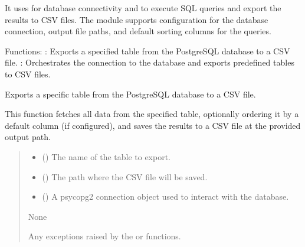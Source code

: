 \documentclass[letterpaper,10pt,english]{sphinxmanual}
\begin{document}
\sphinxAtStartPar
It uses  for database connectivity and  to execute SQL queries and export the results
to CSV files. The module supports configuration for the database connection, output file paths,
and default sorting columns for the queries.

\sphinxAtStartPar
Functions:
\sphinxhyphen{} : Exports a specified table from the PostgreSQL database to a CSV file.
\sphinxhyphen{} : Orchestrates the connection to the database and exports predefined tables to CSV files.

\begin{fulllineitems}
\label{\detokenize{modules.data_storage:modules.data_storage.data_export.export_table_to_csv}}
\pysigstartsignatures
\pysiglinewithargsret
{}
{\sphinxparamcomma {}\sphinxparamcomma {}}
{}
\pysigstopsignatures
\sphinxAtStartPar
Exports a specific table from the PostgreSQL database to a CSV file.

\sphinxAtStartPar
This function fetches all data from the specified table, optionally ordering it
by a default column (if configured), and saves the results to a CSV file at the
provided output path.
\begin{quote}\begin{description}
\begin{itemize}
\item {} 
\sphinxAtStartPar
{} () \textendash{} The name of the table to export.

\item {} 
\sphinxAtStartPar
{} () \textendash{} The path where the CSV file will be saved.

\item {} 
\sphinxAtStartPar
{} () \textendash{} A psycopg2 connection object used to interact with the database.

\end{itemize}

\sphinxAtStartPar
None

\sphinxAtStartPar
Any exceptions raised by the  or  functions.

\end{description}\end{quote}

\end{fulllineitems}
\end{document}
